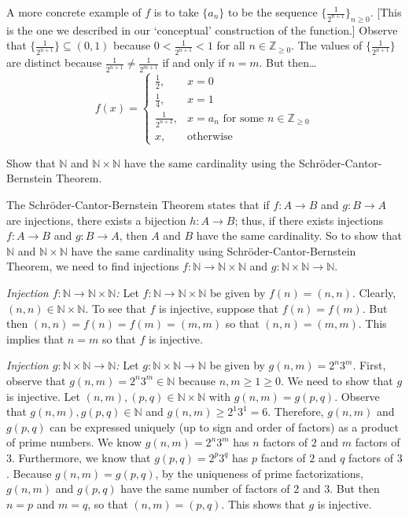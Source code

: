 \documentclass[11pt,letterpaper]{article}
\begin{document}
\begin{enumerate}[(a)]
A more concrete example of $f$ is to take $\{ a_n \}$ to be the sequence $\{ \frac{1}{2^{n +1}} \}_{n \geq 0}$. [This is the one we described in our `conceptual' construction of the function.] Observe that $\{ \frac{1}{2^{n + 1}} \} \subseteq (0, 1)$ because $0 < \frac{1}{2^{n + 1}} < 1$ for all $n \in \mathbb{Z}_{\geq 0}$. The values of $\{ \frac{1}{2^{n + 1}} \}$ are distinct because $\frac{1}{2^{n + 1}} \neq \frac{1}{2^{m + 1}}$ if and only if $n= m$. But then\dots
	\[
	f(x)= 
	\begin{cases}
	\frac{1}{2}, & x= 0 \\
	\frac{1}{4}, & x= 1 \\
	\frac{1}{2^{n+2}}, & x= a_n \text{ for some } n \in \mathbb{Z}_{\geq 0} \\
	x, & \text{otherwise}
	\end{cases}
	\]
\end{enumerate}



\newpage



 Show that $\mathbb{N}$ and $\mathbb{N} \times \mathbb{N}$ have the same cardinality using the Schr\"oder-Cantor-Bernstein Theorem. \pspace

\sol The Schr\"oder-Cantor-Bernstein Theorem states that if $f: A \to B$ and $g: B \to A$ are injections, there exists a bijection $h: A \to B$; thus, if there exists injections $f: A \to B$ and $g: B \to A$, then $A$ and $B$ have the same cardinality. So to show that $\mathbb{N}$ and $\mathbb{N} \times \mathbb{N}$ have the same cardinality using Schr\"oder-Cantor-Bernstein Theorem, we need to find injections $f: \mathbb{N} \to \mathbb{N} \times \mathbb{N}$ and $g: \mathbb{N} \times \mathbb{N} \to \mathbb{N}$.  \pspace

{\itshape Injection $f: \mathbb{N} \to \mathbb{N} \times \mathbb{N}$:} Let $f: \mathbb{N} \to \mathbb{N} \times \mathbb{N}$ be given by $f(n)= (n, n)$. Clearly, $(n, n) \in \mathbb{N} \times \mathbb{N}$. To see that $f$ is injective, suppose that $f(n)= f(m)$. But then $(n, n)= f(n)= f(m)= (m, m)$ so that $(n, n)= (m, m)$. This implies that $n= m$ so that $f$ is injective. \pspace

{\itshape Injection $g: \mathbb{N} \times \mathbb{N} \to \mathbb{N}$:} Let $g: \mathbb{N} \times \mathbb{N} \to \mathbb{N}$ be given by $g(n, m)= 2^n 3^m$. First, observe that $g(n, m)= 2^n 3^m \in \mathbb{N}$ because $n, m \geq 1 \geq 0$. We need to show that $g$ is injective. Let $(n, m), (p, q) \in \mathbb{N} \times \mathbb{N}$ with $g(n, m)= g(p, q)$. Observe that $g(n, m), g(p, q) \in \mathbb{N}$ and $g(n, m) \geq 2^1 3^1= 6$. Therefore, $g(n, m)$ and $g(p, q)$ can be expressed uniquely (up to sign and order of factors) as a product of prime numbers. We know $g(n, m)= 2^n 3^m$ has $n$ factors of $2$ and $m$ factors of $3$. Furthermore, we know that $g(p, q)= 2^p 3^q$ has $p$ factors of $2$ and $q$ factors of $3$. Because $g(n, m)= g(p, q)$, by the uniqueness of prime factorizations, $g(n, m)$ and $g(p, q)$ have the same number of factors of $2$ and $3$. But then $n= p$ and $m= q$, so that $(n, m)= (p, q)$. This shows that $g$ is injective. \pspace
\end{document}
